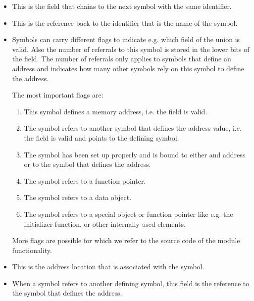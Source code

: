 \begin{itemize}
\item {} This is the field that chains to
the next symbol with the same identifier.

\item {} This is the reference back to the
identifier that is the name of the symbol.

\item {} Symbols can carry different flags
to indicate e.g. which field of the  union is valid. Also the
number of referrals to this symbol is stored in the lower bits of the
 field. The number of referrals only applies to symbols that
define an address and indicates how many other symbols rely on this symbol
to define the address.

The most important flags are:
\begin{enumerate}
\item {} This symbol defines a memory address, i.e. the
 field is valid.
\item {} The symbol refers to another symbol that defines
the address value, i.e. the  field is valid and points
to the defining symbol.
\item {} The symbol has been set up properly and is bound
to either and address or to the symbol that defines the address.
\item {} The symbol refers to a function pointer.
\item {} The symbol refers to a data object.
\item {} The symbol refers to a special object or function
pointer like e.g. the initializer function, or other internally used
elements. 
\end{enumerate}

More flags are possible for which we refer to the source code of the module
functionality.

\item {} This is the address
location that is associated with the symbol.

\item {} When a symbol refers to
another defining symbol, this field is the reference to the symbol that
defines the address.
\end{itemize}

